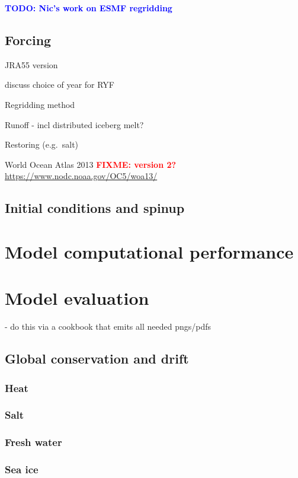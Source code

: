 \documentclass[11pt]{article}
\newcommand{\note}[1]{#1} %
\newcommand{\TODO}[1]{\note{\textcolor{blue}{\textsf{\textbf{TODO: #1}}}}}
\newcommand{\FIXME}[1]{\note{\textcolor{red}{\textsf{\textbf{FIXME: #1}}}}}
\begin{document}
\TODO{Nic's work on ESMF regridding}


\subsection{Forcing}

JRA55 version

discuss choice of year for RYF

Regridding method

Runoff - incl distributed iceberg melt?

Restoring (e.g.\ salt)

World Ocean Atlas 2013 \FIXME{version 2?} \url{https://www.nodc.noaa.gov/OC5/woa13/}

\subsection{Initial conditions and spinup}

\section{Model computational performance}

\section{Model evaluation}
 - do this via a cookbook that emits all needed pngs/pdfs 

\subsection{Global conservation and drift}

\subsubsection{Heat}

\subsubsection{Salt}

\subsubsection{Fresh water}

\subsubsection{Sea ice}
\end{document}
